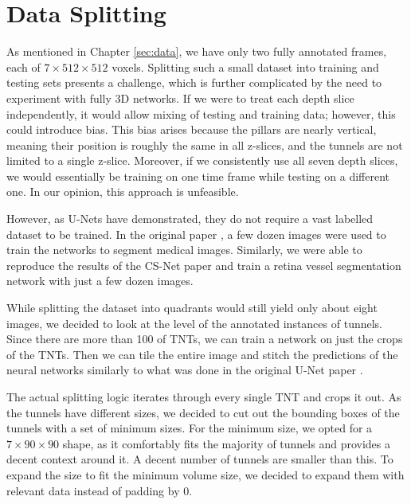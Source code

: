 \documentclass[
  digital,     %
  oneside,     %
  nosansbold,  %
  nocolorbold, %
  lof,         %
  lot,         %
]{fithesis4}
\begin{document}
\section{Data Splitting}
\label{sec:processing_data}

As mentioned in Chapter \ref{sec:data}, we have only two fully annotated frames, each of $7 \times 512 \times 512$ voxels. Splitting such a small dataset into training and testing sets presents a challenge, which is further complicated by the need to experiment with fully 3D networks. If we were to treat each depth slice independently, it would allow mixing of testing and training data; however, this could introduce bias. This bias arises because the pillars are nearly vertical, meaning their position is roughly the same in all z-slices, and the tunnels are not limited to a single z-slice. Moreover, if we consistently use all seven depth slices, we would essentially be training on one time frame while testing on a different one. In our opinion, this approach is unfeasible.

However, as U-Nets have demonstrated, they do not require a vast labelled dataset to be trained. In the original paper \parencite{Ronneberger2015}, a few dozen images were used to train the networks to segment medical images. Similarly, we were able to reproduce the results of the CS-Net paper \parencite{Mou2021} and train a retina vessel segmentation network with just a few dozen images.

While splitting the dataset into quadrants would still yield only about eight images, we decided to look at the level of the annotated instances of tunnels. Since there are more than 100 of TNTs, we can train a network on just the crops of the TNTs. Then we can tile the entire image and stitch the predictions of the neural networks similarly to what was done in the original U-Net paper \parencite{Ronneberger2015}.

The actual splitting logic iterates through every single TNT and crops it out. As the tunnels have different sizes, we decided to cut out the bounding boxes of the tunnels with a set of minimum sizes. For the minimum size, we opted for a $7 \times 90 \times 90$ shape, as it comfortably fits the majority of tunnels and provides a decent context around it. A decent number of tunnels are smaller than this. To expand the size to fit the minimum volume size, we decided to expand them with relevant data instead of padding by 0.
\end{document}
